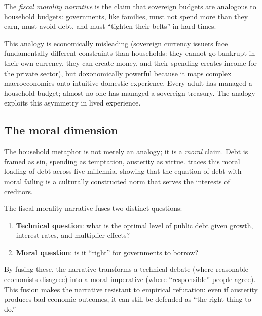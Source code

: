 \begin{definition}
\label{def:fiscal-morality}
The \emph{fiscal morality narrative} is the claim that sovereign budgets are analogous to household budgets: governments, like families, must not spend more than they earn, must avoid debt, and must ``tighten their belts'' in hard times.
\end{definition}

This analogy is economically misleading (sovereign currency issuers face fundamentally different constraints than households: they cannot go bankrupt in their own currency, they can create money, and their spending creates income for the private sector), but doxonomically powerful because it maps complex macroeconomics onto intuitive domestic experience.
Every adult has managed a household budget; almost no one has managed a sovereign treasury.
The analogy exploits this asymmetry in lived experience.

\subsection{The moral dimension}

The household metaphor is not merely an analogy; it is a \emph{moral} claim.
Debt is framed as sin, spending as temptation, austerity as virtue.
\textcite{graeber2011} traces this moral loading of debt across five millennia, showing that the equation of debt with moral failing is a culturally constructed norm that serves the interests of creditors.

\begin{proposition}
\label{prop:debt-morality}
The fiscal morality narrative fuses two distinct questions:
\begin{enumerate}[nosep]
  \item \textbf{Technical question}: what is the optimal level of public debt given growth, interest rates, and multiplier effects?
  \item \textbf{Moral question}: is it ``right'' for governments to borrow?
\end{enumerate}
By fusing these, the narrative transforms a technical debate (where reasonable economists disagree) into a moral imperative (where ``responsible'' people agree).
This fusion makes the narrative resistant to empirical refutation: even if austerity produces bad economic outcomes, it can still be defended as ``the right thing to do.''
\end{proposition}

